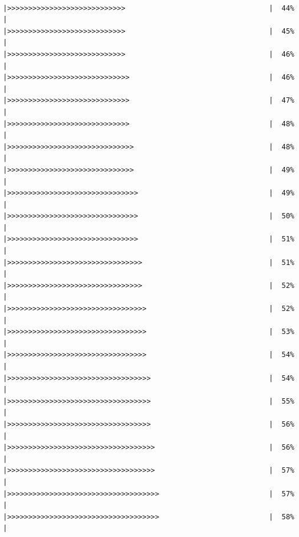 \documentclass[
]{book}
\begin{document}
\begin{verbatim}
                                                           |>>>>>>>>>>>>>>>>>>>>>>>>>>>>                                  |  44%  |                                                                      |>>>>>>>>>>>>>>>>>>>>>>>>>>>>                                  |  45%  |                                                                      |>>>>>>>>>>>>>>>>>>>>>>>>>>>>                                  |  46%  |                                                                      |>>>>>>>>>>>>>>>>>>>>>>>>>>>>>                                 |  46%  |                                                                      |>>>>>>>>>>>>>>>>>>>>>>>>>>>>>                                 |  47%  |                                                                      |>>>>>>>>>>>>>>>>>>>>>>>>>>>>>                                 |  48%  |                                                                      |>>>>>>>>>>>>>>>>>>>>>>>>>>>>>>                                |  48%  |                                                                      |>>>>>>>>>>>>>>>>>>>>>>>>>>>>>>                                |  49%  |                                                                      |>>>>>>>>>>>>>>>>>>>>>>>>>>>>>>>                               |  49%  |                                                                      |>>>>>>>>>>>>>>>>>>>>>>>>>>>>>>>                               |  50%  |                                                                      |>>>>>>>>>>>>>>>>>>>>>>>>>>>>>>>                               |  51%  |                                                                      |>>>>>>>>>>>>>>>>>>>>>>>>>>>>>>>>                              |  51%  |                                                                      |>>>>>>>>>>>>>>>>>>>>>>>>>>>>>>>>                              |  52%  |                                                                      |>>>>>>>>>>>>>>>>>>>>>>>>>>>>>>>>>                             |  52%  |                                                                      |>>>>>>>>>>>>>>>>>>>>>>>>>>>>>>>>>                             |  53%  |                                                                      |>>>>>>>>>>>>>>>>>>>>>>>>>>>>>>>>>                             |  54%  |                                                                      |>>>>>>>>>>>>>>>>>>>>>>>>>>>>>>>>>>                            |  54%  |                                                                      |>>>>>>>>>>>>>>>>>>>>>>>>>>>>>>>>>>                            |  55%  |                                                                      |>>>>>>>>>>>>>>>>>>>>>>>>>>>>>>>>>>                            |  56%  |                                                                      |>>>>>>>>>>>>>>>>>>>>>>>>>>>>>>>>>>>                           |  56%  |                                                                      |>>>>>>>>>>>>>>>>>>>>>>>>>>>>>>>>>>>                           |  57%  |                                                                      |>>>>>>>>>>>>>>>>>>>>>>>>>>>>>>>>>>>>                          |  57%  |                                                                      |>>>>>>>>>>>>>>>>>>>>>>>>>>>>>>>>>>>>                          |  58%  |                                                                
\end{verbatim}
\end{document}
